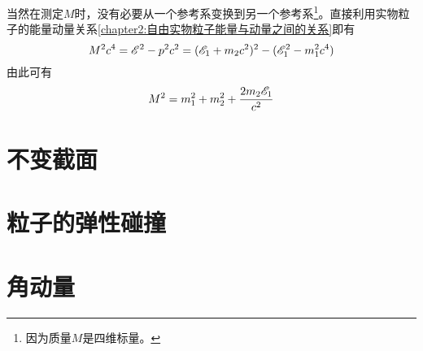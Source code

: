 当然在测定$M$时，没有必要从一个参考系变换到另一个参考系\footnote{因为质量$M$是四维标量。}。直接利用实物粒子的能量动量关系\eqref{chapter2:自由实物粒子能量与动量之间的关系}即有
\begin{equation*}
	M^2c^4 = \mathscr{E}^2-p^2c^2 = (\mathscr{E}_1+m_2c^2)^2-(\mathscr{E}_1^2-m_1^2c^4)
\end{equation*}
由此可有
\begin{equation}
	M^2 = m_1^2+m_2^2+\frac{2m_2\mathscr{E}_1}{c^2}
\end{equation}

\section{不变截面}

\section{粒子的弹性碰撞}

\section{角动量}

